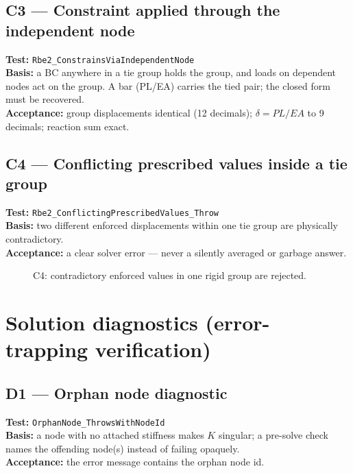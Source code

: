 \documentclass[11pt,a4paper]{article}
\begin{document}
\subsection{C3 --- Constraint applied through the independent node}
\textbf{Test:} \texttt{Rbe2\_ConstrainsViaIndependentNode}\\
\textbf{Basis:} a BC anywhere in a tie group holds the group, and loads on
dependent nodes act on the group. A bar (PL/EA) carries the tied pair; the
closed form must be recovered.\\
\textbf{Acceptance:} group displacements identical (12 decimals);
$\delta = PL/EA$ to 9 decimals; reaction sum exact.

\subsection{C4 --- Conflicting prescribed values inside a tie group}
\textbf{Test:} \texttt{Rbe2\_ConflictingPrescribedValues\_Throw}\\
\textbf{Basis:} two different enforced displacements within one tie group are
physically contradictory.\\
\textbf{Acceptance:} a clear solver error --- never a silently averaged or
garbage answer.

\begin{figure}[H]\centering
{}
\caption{C4: contradictory enforced values in one rigid group are rejected.}
\end{figure}

\section{Solution diagnostics (error-trapping verification)}

\subsection{D1 --- Orphan node diagnostic}
\textbf{Test:} \texttt{OrphanNode\_ThrowsWithNodeId}\\
\textbf{Basis:} a node with no attached stiffness makes $K$ singular; a
pre-solve check names the offending node(s) instead of failing opaquely.\\
\textbf{Acceptance:} the error message contains the orphan node id.
\end{document}
